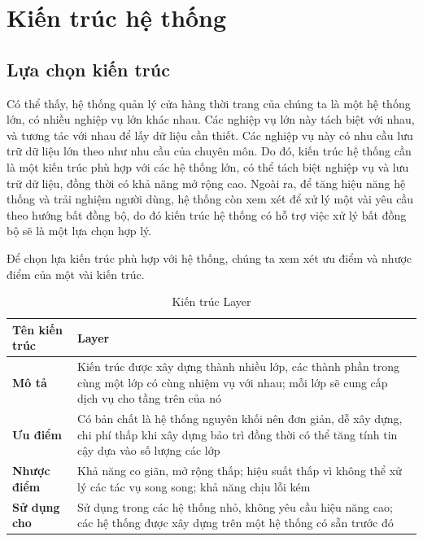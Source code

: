 
\section{Kiến trúc hệ thống}
\subsection{Lựa chọn kiến trúc}
 
\hspace*{0.5cm}Có thể thấy, hệ thống quản lý cửa hàng thời trang của chúng ta là một hệ thống lớn, có nhiều nghiệp vụ lớn khác nhau. Các nghiệp vụ lớn này tách biệt với nhau, và tương tác với nhau để lấy dữ liệu cần thiết. Các nghiệp vụ này có nhu cầu lưu trữ dữ liệu lớn theo như nhu cầu của chuyên môn. Do đó, kiến trúc hệ thống cần là một kiến trúc phù hợp với các hệ thống lớn, có thể tách biệt nghiệp vụ và lưu trữ dữ liệu, đồng thời có khả năng mở rộng cao. Ngoài ra, để tăng hiệu năng hệ thống và trải nghiệm người dùng, hệ thống còn xem xét để xử lý một vài yêu cầu theo hướng bất đồng bộ, do đó kiến trúc hệ thống có hỗ trợ việc xử lý bất đồng bộ sẽ là một lựa chọn hợp lý.

Để chọn lựa kiến trúc phù hợp với hệ thống, chúng ta xem xét ưu điểm và nhược điểm của một vài kiến trúc.\\
 
\begin{table}[h]
    \begin{tabular}{|p{3cm}|p{12cm}|}
        \hline
        \textbf{Tên kiến trúc} & Layer\\
        \hline
        \textbf{Mô tả}         & Kiến trúc được xây dựng thành nhiều lớp, các thành phần trong cùng một lớp có cùng nhiệm vụ với nhau; mỗi lớp sẽ cung cấp dịch vụ cho tầng trên của nó \\
        \hline
        \textbf{Ưu điểm}       & Có bản chất là hệ thống nguyên khối nên đơn giản, dễ xây dựng, chi phí thấp khi xây dựng bảo trì đồng thời có thể tăng tính tin cậy dựa vào số lượng các lớp \\
        \hline
        \textbf{Nhược điểm}    & Khả năng co giãn, mở rộng thấp; hiệu suất thấp vì không thể xử lý các tác vụ song song; khả năng chịu lỗi kém\\
        \hline
        \textbf{Sử dụng cho}   & Sử dụng trong các hệ thống nhỏ, không yêu cầu hiệu năng cao; các hệ thống được xây dựng trên một hệ thống có sẵn trước đó \\
        \hline
    \end{tabular}
    \caption{Kiến trúc Layer}
\end{table}
 
